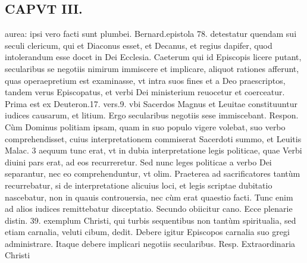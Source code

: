 \documentclass{article}
\begin{document}
\begin{pages}
\section*{CAPVT  III. }
\marginpar{[ p.152 ]}\pstart aurea: ipsi vero facti sunt plumbei. Bernard.epistola 78. detestatur quendam sui seculi clericum, qui et Diaconus esset, et Decanus, et regius dapifer, quod intolerandum esse docet in Dei Ecclesia.  \pend\pstart Caeterum qui id Episcopis licere putant, secularibus se negotiis nimirum immiscere et implicare, aliquot rationes afferunt, quas operaepretium est examinasse, vt intra suos fines et a Deo praescriptos, tandem verus Episcopatus, et verbi Dei ministerium reuocetur et coerceatur.  \pend\pstart Prima est ex Deuteron.17. vers.9. vbi Sacerdos Magnus et Leuitae constituuntur iudices causarum, et litium. Ergo secularibus negotiis sese immiscebant. Respon. Cùm Dominus politiam ipsam, quam in suo populo vigere volebat, suo verbo comprehendisset, cuius interpretationem commiserat Sacerdoti summo, et Leuitis Malac. 3 aequum tunc erat, vt in dubia interpretatione legis politicae, quae Verbi diuini pars erat, ad eos recurreretur. Sed nunc leges politicae a verbo Dei separantur, nec eo comprehenduntur, vt olim. Praeterea ad sacrificatores tantùm recurrebatur, si de interpretatione alicuius loci, et legis scriptae dubitatio nascebatur, non in quauis controuersia, nec cùm erat quaestio facti. Tunc enim ad alios iudices remittebatur disceptatio.  \pend\pstart Secundo obiicitur cano. Ecce plenarie distin. 39. exemplum Christi, qui turbis sequentibus non tantùm spiritualia, sed etiam carnalia, veluti cibum, dedit. Debere igitur Episcopos carnalia suo gregi administrare. Itaque debere implicari negotiis secularibus. Resp. Extraordinaria Christi  \pend

\end{pages}
\end{document}
